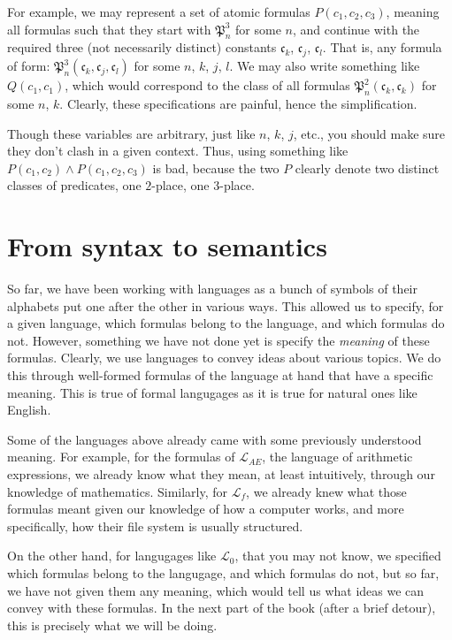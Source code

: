 For example, we may represent a set of atomic formulas $P(c_1, c_2, c_3)$, meaning all formulas such that they start with $\mathfrak{P}^3_n$ for some $n$, and continue with the required three (not necessarily distinct) constants $\mathfrak{c}_k$, $\mathfrak{c}_j$, $\mathfrak{c}_l$. That is, any formula of form: $\mathfrak{P}^3_n(\mathfrak{c}_k, \mathfrak{c}_j, \mathfrak{c}_l)$ for some $n$, $k$, $j$, $l$. We may also write something like $Q(c_1, c_1)$, which would correspond to the class of all formulas $\mathfrak{P}^2_n(\mathfrak{c}_k, \mathfrak{c}_k)$ for some $n$, $k$. Clearly, these specifications are painful, hence the simplification. 

Though these variables are arbitrary, just like $n$, $k$, $j$, etc., you should make sure they don't clash in a given context. Thus, using something like $P(c_1, c_2) \wedge P(c_1, c_2, c_3)$ is bad, because the two $P$ clearly denote two distinct classes of predicates, one $2$-place, one $3$-place. 

\section{From syntax to semantics}

So far, we have been working with languages as a bunch of symbols of their alphabets put one after the other in various ways. This allowed us to specify, for a given language, which formulas belong to the language, and which formulas do not. However, something we have not done yet is specify the \textit{meaning} of these formulas. Clearly, we use languages to convey ideas about various topics. We do this through well-formed formulas of the language at hand that have a specific meaning. This is true of formal langugages as it is true for natural ones like English. 

Some of the languages above already came with some previously understood meaning. For example, for the formulas of $\mathcal{L}_{AE}$, the language of arithmetic expressions, we already know what they mean, at least intuitively, through our knowledge of mathematics. Similarly, for $\mathcal{L}_f$, we already knew what those formulas meant given our knowledge of how a computer works, and more specifically, how their file system is usually structured. 

On the other hand, for langugages like $\mathcal{L}_0$, that you may not know, we specified which formulas belong to the langugage, and which formulas do not, but so far, we have not given them any meaning, which would tell us what ideas we can convey with these formulas. In the next part of the book (after a brief detour), this is precisely what we will be doing. 


